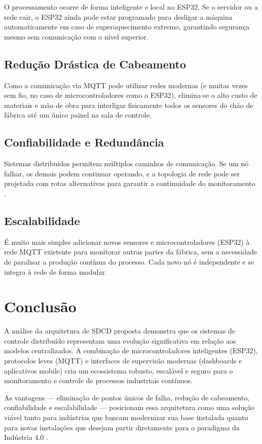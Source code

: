 \documentclass[12pt,a4paper,oneside]{article}
\begin{document}
O processamento ocorre de forma inteligente e local no ESP32. Se o servidor ou a rede cair, o ESP32 ainda pode estar programado para desligar a máquina automaticamente em caso de superaquecimento extremo, garantindo segurança mesmo sem comunicação com o nível superior.

\subsection{Redução Drástica de Cabeamento}

Como a comunicação via MQTT pode utilizar redes modernas (e muitas vezes sem fio, no caso de microcontroladores como o ESP32), elimina-se o alto custo de materiais e mão de obra para interligar fisicamente todos os sensores do chão de fábrica até um único painel na sala de controle.

\subsection{Confiabilidade e Redundância}

Sistemas distribuídos permitem múltiplos caminhos de comunicação. Se um nó falhar, os demais podem continuar operando, e a topologia de rede pode ser projetada com rotas alternativas para garantir a continuidade do monitoramento \cite{lugli2009}.

\subsection{Escalabilidade}

É muito mais simples adicionar novos sensores e microcontroladores (ESP32) à rede MQTT existente para monitorar outras partes da fábrica, sem a necessidade de paralisar a produção contínua do processo. Cada novo nó é independente e se integra à rede de forma modular.

\section{Conclusão}

A análise da arquitetura de SDCD proposta demonstra que os sistemas de controle distribuído representam uma evolução significativa em relação aos modelos centralizados. A combinação de microcontroladores inteligentes (ESP32), protocolos leves (MQTT) e interfaces de supervisão modernas (dashboards e aplicativos mobile) cria um ecossistema robusto, escalável e seguro para o monitoramento e controle de processos industriais contínuos.

As vantagens --- eliminação de pontos únicos de falha, redução de cabeamento, confiabilidade e escalabilidade --- posicionam essa arquitetura como uma solução viável tanto para indústrias que buscam modernizar sua base instalada quanto para novas instalações que desejam partir diretamente para o paradigma da Indústria 4.0 \cite{schwab2016}.



\end{document}
